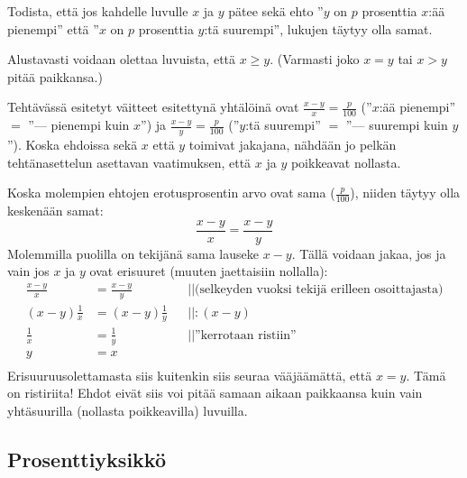 \begin{esimerkki} 
Todista, että jos kahdelle luvulle $x$ ja $y$ pätee sekä ehto ''$y$ on $p$ prosenttia $x$:ää pienempi'' että ''$x$ on $p$ prosenttia $y$:tä suurempi'', lukujen täytyy olla samat.
		\begin{esimratk}
Alustavasti voidaan olettaa luvuista, että $x \geq y$. (Varmasti joko $x=y$ tai $x>y$ pitää paikkansa.) %

Tehtävässä esitetyt väitteet esitettynä yhtälöinä ovat $\frac{x-y}{x}=\frac{p}{100}$ (''$x$:ää pienempi'' $=$ ''{--}{--} pienempi kuin $x$'') ja $\frac{x-y}{y}=\frac{p}{100}$ (''$y$:tä suurempi'' $=$ ''{--}{--} suurempi kuin $y$''). Koska ehdoissa sekä $x$ että $y$ toimivat jakajana, nähdään jo pelkän tehtänasettelun asettavan vaatimuksen, että $x$ ja $y$ poikkeavat nollasta.

Koska molempien ehtojen erotusprosentin arvo ovat sama ($\frac{p}{100}$), niiden täytyy olla keskenään samat:
$$\frac{x-y}{x}=\frac{x-y}{y}$$
Molemmilla puolilla on tekijänä sama lauseke $x-y$. Tällä voidaan jakaa, jos ja vain jos $x$ ja $y$ ovat erisuuret (muuten jaettaisiin nollalla):
\begin{align*}
\frac{x-y}{x}&=\frac{x-y}{y} && ||\text{(selkeyden vuoksi tekijä erilleen osoittajasta)}\\
(x-y)\frac{1}{x}&=(x-y)\frac{1}{y} &&||:(x-y) \\
\frac{1}{x}&=\frac{1}{y} && ||\text{''kerrotaan ristiin''} \\
y&=x && \\
\end{align*}
Erisuuruusolettamasta siis kuitenkin siis seuraa vääjäämättä, että $x=y$. Tämä on ristiriita! Ehdot eivät siis voi pitää samaan aikaan paikkaansa kuin vain yhtäsuurilla (nollasta poikkeavilla) luvuilla. %
		\end{esimratk}
\end{esimerkki}

\subsection{Prosenttiyksikkö}


